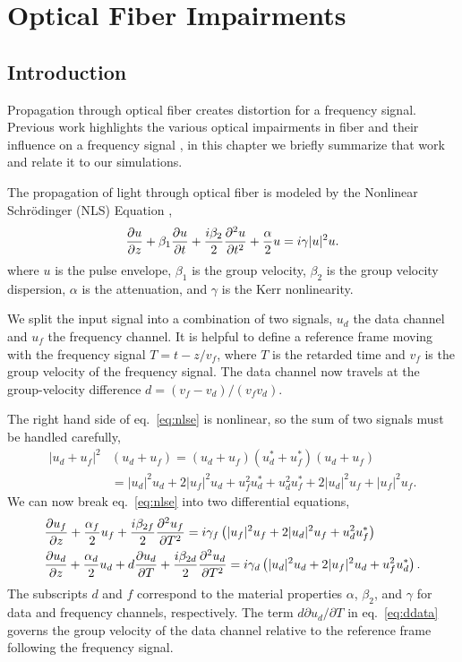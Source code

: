 
\chapter{Optical Fiber Impairments}
\label{chap:fiber_impairments}


\section{Introduction}

Propagation through optical fiber creates distortion for a frequency signal. Previous work highlights the various optical impairments in fiber and their influence on a frequency signal \cite{menyukIFCS2015}, in this chapter we briefly summarize that work and relate it to our simulations.

The propagation of light through optical fiber is modeled by the Nonlinear Schr{\"o}dinger (NLS) Equation \cite{Agrawal2013},
%
\begin{equation} \label{eq:nlse}
\frac{\partial u}{\partial z} + \beta_1\frac{\partial u}{\partial t} + \frac{i\beta_2}{2}\frac{\partial ^2u}{\partial t^2} + \frac{\alpha}{2}u = i\gamma|u|^2u.
\end{equation}
where $u$ is the pulse envelope, $\beta_1$ is the group velocity, $\beta_2$ is the group velocity dispersion, $\alpha$ is the attenuation, and $\gamma$ is the Kerr nonlinearity. 

We split the input signal into a combination of two signals, $u_d$ the data channel and $u_f$ the frequency channel. It is helpful to define a reference frame moving with the frequency signal $T = t - z/v_f$, where $T$ is the retarded time and $v_f$ is the group velocity of the frequency signal. The data channel now travels at the group-velocity difference $d = (v_f - v_d)/(v_fv_d)$.

The right hand side of eq.~\ref{eq:nlse} is nonlinear, so the sum of two signals must be handled carefully,
%
\begin{align}
\nonumber
|u_d + u_f|^2&(u_d + u_f) = (u_d + u_f)(u_d^* + u_f^*)(u_d + u_f) \\
&= |u_d|^2u_d + 2|u_f|^2u_d + u_f^2u_d^* + u_d^2u_f^* + 2|u_d|^2u_f + |u_f|^2u_f.
\end{align}
%
We can now break eq.~\ref{eq:nlse} into two differential equations,
%
\begin{align}
\label{eq:dfreq}
&\frac{\partial u_f}{\partial z} + \frac{\alpha_f}{2}u_f + \frac{i\beta_{2f}}{2}\frac{\partial ^2u_f}{\partial T^2} = i\gamma_f\left( |u_f|^2u_f + 2|u_d|^2u_f + u_d^2u_f^* \right) \\
\label{eq:ddata}
&\frac{\partial u_d}{\partial z} + \frac{\alpha_d}{2}u_d + d\frac{\partial u_d}{\partial T} + \frac{i\beta_{2d}}{2}\frac{\partial ^2u_d}{\partial T^2} = i\gamma_d\left( |u_d|^2u_d + 2|u_f|^2u_d + u_f^2u_d^* \right).
\end{align}
%
The subscripts $d$ and $f$ correspond to the material properties $\alpha$, $\beta_2$, and $\gamma$ for data and frequency channels, respectively. The term $d\partial u_d/\partial T$ in eq.~\ref{eq:ddata} governs the group velocity of the data channel relative to the reference frame following the frequency signal.

